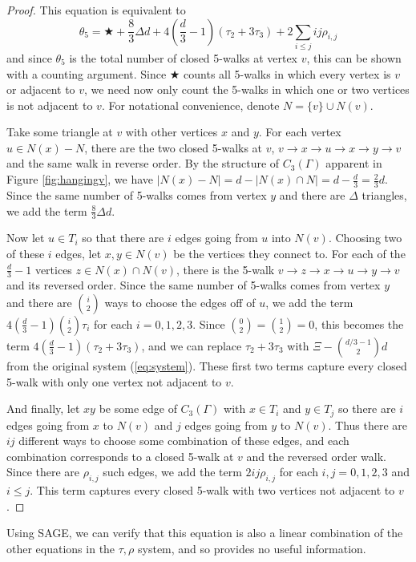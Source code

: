 \documentclass[12pt]{report}
\theoremstyle{definition}
\begin{document}
\begin{proof}
    This equation is equivalent to
    \[\theta_5=\bigstar+\frac{8}{3}\Delta d +4\left(\frac{d}{3}-1 \right)(\tau_2+3\tau_3)+2\sum_{i \leq j}ij\rho_{i,j}\]
    and since $\theta_5$ is the total number of closed 5-walks at vertex $v$, this can be shown with a counting argument. Since $\bigstar$ counts all 5-walks in which every vertex is $v$ or adjacent to $v$, we need now only count the 5-walks in which one or two vertices is not adjacent to $v$. For notational convenience, denote $N=\{v\}\cup N(v)$.\par
    Take some triangle at $v$ with other vertices $x$ and $y$. For each vertex $u\in N(x)-N$, there are the two closed 5-walks at $v$, $v\to x\to u\to x\to y\to v$ and the same walk in reverse order. By the structure of $C_3(\Gamma)$ apparent in Figure \ref{fig:hangingv}, we have $|N(x)-N|=d-|N(x)\cap N|=d-\frac{d}{3}=\frac{2}{3}d$. Since the same number of 5-walks comes from vertex $y$ and there are $\Delta$ triangles, we add the term $\frac{8}{3}\Delta d$.\par
    Now let $u\in T_i$ so that there are $i$ edges going from $u$ into $N(v)$. Choosing two of these $i$ edges, let $x,y \in N(v)$ be the vertices they connect to. For each of the $\frac{d}{3}-1$ vertices $z\in N(x)\cap N(v)$, there is the 5-walk $v\to z\to x\to u\to y\to v$ and its reversed order. Since the same number of 5-walks comes from vertex $y$ and there are $\binom{i}{2}$ ways to choose the edges off of $u$, we add the term $4\left(\frac{d}{3}-1\right)\binom{i}{2}\tau_i$ for each $i=0,1,2,3$. Since $\binom{0}{2}=\binom{1}{2}=0$, this becomes the term $4\left(\frac{d}{3}-1 \right)(\tau_2+3\tau_3)$, and we can replace $\tau_2+3\tau_3$ with $\Xi -\binom{d/3-1}{2}d$ from the original system (\ref{eq:system}). These first two terms capture every closed 5-walk with only one vertex not adjacent to $v$.\par
    And finally, let $xy$ be some edge of $C_3(\Gamma)$ with $x\in T_i$ and $y\in T_j$ so there are $i$ edges going from $x$ to $N(v)$ and $j$ edges going from $y$ to $N(v)$. Thus there are $ij$ different ways to choose some combination of these edges, and each combination corresponds to a closed 5-walk at $v$ and the reversed order walk. Since there are $\rho_{i,j}$ such edges, we add the term $2ij\rho_{i,j}$ for each $i,j=0,1,2,3$ and $i\leq j$. This term captures every closed 5-walk with two vertices not adjacent to $v$.
\end{proof}\par
Using SAGE, we can verify that this equation is also a linear combination of the other equations in the $\tau,\rho$ system, and so provides no useful information.\par
\end{document}
